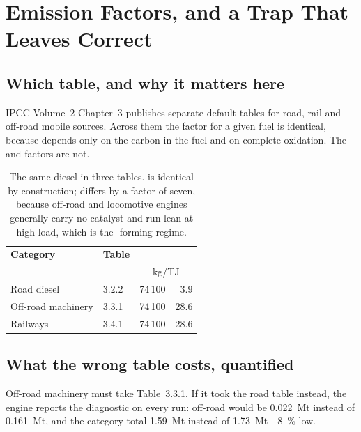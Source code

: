 \section{Emission Factors, and a Trap That Leaves \COtwo{} Correct}
\label{sec:factors}

\subsection{Which table, and why it matters here}

IPCC Volume~2 Chapter~3 publishes separate default tables for road, rail and off-road mobile
sources. Across them the \COtwo{} factor for a given fuel is identical, because \COtwo{}
depends only on the carbon in the fuel and on complete oxidation. The \CHfour{} and \NtwoO{}
factors are not.

\begin{table}[htbp]
\centering
\footnotesize
\begin{tabular}{@{}llrr@{}}
\toprule
\textbf{Category} & \textbf{Table} & \textbf{\COtwo{}} & \textbf{\NtwoO{}} \\
 & & \multicolumn{2}{c}{kg/TJ} \\
\midrule
Road diesel        & 3.2.2 & 74\,100 & 3.9 \\
Off-road machinery & 3.3.1 & 74\,100 & 28.6 \\
Railways           & 3.4.1 & 74\,100 & 28.6 \\
\bottomrule
\end{tabular}
\caption{The same diesel in three tables. \COtwo{} is identical by construction; \NtwoO{}
differs by a factor of seven, because off-road and locomotive engines generally carry no
catalyst and run lean at high load, which is the \NtwoO{}-forming regime.}
\label{tab:tables}
\end{table}

\subsection{What the wrong table costs, quantified}

Off-road machinery must take Table~3.3.1. If it took the road table instead, the engine
reports the diagnostic on every run: off-road \NtwoO{} would be \SI{0.022}{\mega\tonne}
instead of \SI{0.161}{\mega\tonne}, and the category total \SI{1.59}{\mega\tonne} instead of
\SI{1.73}{\mega\tonne}---\SI{8}{\percent} low.

